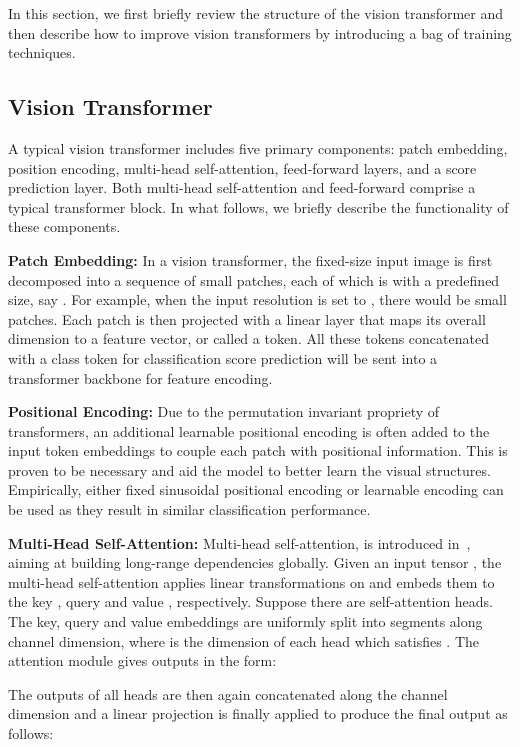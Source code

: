 \documentclass[10pt,twocolumn,letterpaper]{article}
\newcommand{\myPara}[1]{\vspace{.05in}\noindent\textbf{#1:}}
\begin{document}
In this section, we first briefly review the structure of the vision transformer and then
describe how to improve vision transformers by introducing a bag of training techniques.

\subsection{Vision Transformer}

A typical vision transformer \cite{dosovitskiy2020image} includes five primary components:
patch embedding, position encoding, multi-head self-attention, feed-forward layers, and a score prediction layer.
Both multi-head self-attention and feed-forward comprise a typical transformer block.
In what follows, we briefly describe the functionality of these components.

\myPara{Patch Embedding}
In a vision transformer, the fixed-size input image is first decomposed into a sequence of small patches,
each of which is with a predefined size, say .
For example, when the input resolution is set to , there would be 
small patches.
Each patch is then projected with a linear layer that maps its overall dimension 
to a feature vector, or called a token.
All these tokens concatenated with a class token for classification score prediction will be sent into
a transformer backbone for feature encoding.

\myPara{Positional Encoding}
Due to the permutation invariant propriety of transformers, an additional learnable positional encoding
is often added to the input token embeddings to couple each patch with positional information.
This is proven to be necessary and aid the model to better learn the visual structures.
Empirically, either fixed sinusoidal positional encoding \cite{vaswani2017attention} 
or learnable encoding can be used as they result in similar classification performance. 

\myPara{Multi-Head Self-Attention}
Multi-head self-attention, is introduced in~\cite{vaswani2017attention},
aiming at building long-range dependencies globally.
Given an input tensor ,  the multi-head self-attention applies linear transformations on  and 
embeds them to the key , query  and value , respectively.
Suppose there are  self-attention heads.
The key, query and value embeddings are uniformly split into  segments  along channel dimension, where  is the dimension of each head which satisfies . 
The attention module gives outputs in the form:

The outputs of all heads are then again concatenated 
along the channel dimension and a linear projection is finally applied to produce the final output
as follows:
\end{document}
